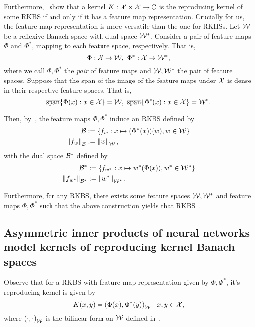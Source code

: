 Furthermore,~\parencite[Theorems 3 and 4]{zhangReproducingKernel2009} show that a kernel $K: {\mathcal{X}} \times {\mathcal{X}} \to {\mathbb{C}}$ is the reproducing kernel of some RKBS if and only if it has a feature map representation. Crucially for us, the feature map representation is more versatile than the one for RKHSs. Let ${\mathcal{W}}$ be a reflexive Banach space with dual space ${\mathcal{W}}^*$. Consider a pair of feature maps $\Phi$ and $\Phi^*$, mapping to each feature space, respectively. That is,
\begin{equation*}
    \Phi: \calX \to \calW, \ \Phi^*: \calX \to \calW^*,
\end{equation*}
where we call $\Phi, \Phi^*$ the \textit{pair} of feature maps and ${\mathcal{W}}, {\mathcal{W}}^*$ the pair of feature spaces. Suppose that the span of the image of the feature maps under ${\mathcal{X}}$ is dense in their respective feature spaces. That is,
\begin{equation}
    \overline{\text{span}}\{\Phi(x): x \in \calX\} = \calW, \ \overline{\text{span}}\{\Phi^*(x): x \in \calX\} = \calW^*.
\end{equation}

Then, by~\parencite[Theorem 3]{zhangReproducingKernel2009}, the feature maps $\Phi, \Phi^*$ induce an RKBS defined by
\begin{align}
    \calB &:= \set{f_w: x \mapsto (\Phi^*(x))(w), w \in \calW} \\
    \norm{f_w}_\calB &:= \norm{w}_\calW,
\end{align}
with the dual space ${\mathcal{B}}^*$ defined by
\begin{align}
    \calB^* &:= \set{f_{w^*}: x \mapsto w^*(\Phi(x)), w^* \in \calW^*} \\
    \norm{f_{w^*}}_{\calB^*} &:= \norm{w^*}_{\calW^*}.
\end{align}

Furthermore, for any RKBS, there exists some feature spaces ${\mathcal{W}}, {\mathcal{W}}^*$ and feature maps $\Phi, \Phi^*$ such that the above construction yields that RKBS~\parencite[Theorem 4]{zhangReproducingKernel2009}.

\subsection{Asymmetric inner products of neural networks model kernels of reproducing kernel Banach spaces}

Observe that for a RKBS with feature-map representation given by $\Phi, \Phi^*$, it's reproducing kernel is given by
\begin{equation}
    K(x, y) = \paren{\Phi(x), \Phi^*(y)}_{\calW}, \ x, y \in \calX,
\end{equation}
where $\left(\cdot, \cdot\right)_{{\mathcal{W}}}$ is the bilinear form on ${\mathcal{W}}$ defined in~.


